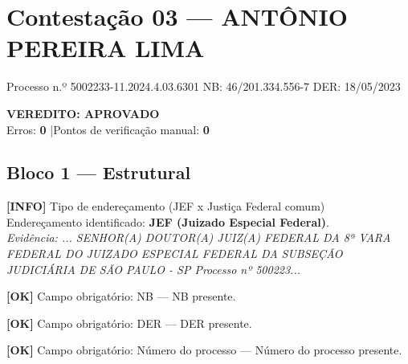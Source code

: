 \documentclass[12pt,a4paper]{article}
\newcommand{\statusOK}[1]{\textcolor{corOK}{\textbf{[OK]}} #1}
\newcommand{\statusINFO}[1]{\textcolor{corINFO}{\textbf{[INFO]}} #1}
\begin{document}
\clearpage
\tableofcontents


\clearpage
{}
\section{Contestação 03 --- ANTÔNIO PEREIRA LIMA}
\begin{center}
  {\small Processo n.º 5002233-11.2024.4.03.6301 \quad NB: 46/201.334.556-7 \quad DER: 18/05/2023}
\end{center}

\vspace{0.5em}

\noindent\colorbox{corFundoAprovado}{%
  \begin{minipage}{\dimexpr\linewidth-2\fboxsep}
    \centering
    \vspace{0.3em}
    {\large \textcolor{corOK}{\textbf{VEREDITO: APROVADO}}}\\
    Erros: \textbf{0} \quad|\quad Pontos de verificação manual: \textbf{0}
    \vspace{0.3em}
  \end{minipage}%
}

\vspace{1em}


\subsection{Bloco 1 --- Estrutural}

\statusINFO{Tipo de endereçamento (JEF x Justiça Federal comum)}\\
Endereçamento identificado: \textbf{JEF (Juizado Especial Federal)}.\\
\textit{Evidência: ... SENHOR(A) DOUTOR(A) JUIZ(A) FEDERAL DA 8ª VARA FEDERAL DO JUIZADO ESPECIAL FEDERAL DA SUBSEÇÃO JUDICIÁRIA DE SÃO PAULO - SP Processo nº 500223...}

\medskip
\statusOK{Campo obrigatório: NB} --- NB presente.

\medskip
\statusOK{Campo obrigatório: DER} --- DER presente.

\medskip
\statusOK{Campo obrigatório: Número do processo} --- Número do processo presente.
\end{document}
